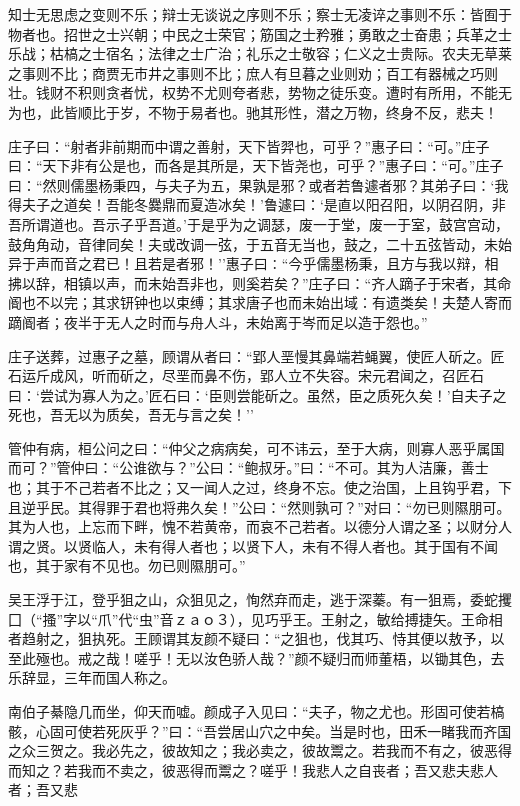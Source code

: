 \documentclass[]{article}
\begin{document}
知士无思虑之变则不乐；辩士无谈说之序则不乐；察士无凌谇之事则不乐：皆囿于物者也。招世之士兴朝；中民之士荣官；筋国之士矜雅；勇敢之士奋患；兵革之士乐战；枯槁之士宿名；法律之士广治；礼乐之士敬容；仁义之士贵际。农夫无草莱之事则不比；商贾无市井之事则不比；庶人有旦暮之业则劝；百工有器械之巧则壮。钱财不积则贪者忧，权势不尤则夸者悲，势物之徒乐变。遭时有所用，不能无为也，此皆顺比于岁，不物于易者也。驰其形性，潜之万物，终身不反，悲夫！

庄子曰：``射者非前期而中谓之善射，天下皆羿也，可乎？''惠子曰：``可。''庄子曰：``天下非有公是也，而各是其所是，天下皆尧也，可乎？''惠子曰：``可。''庄子曰：``然则儒墨杨秉四，与夫子为五，果孰是邪？或者若鲁遽者邪？其弟子曰：`我得夫子之道矣！吾能冬爨鼎而夏造冰矣！'鲁遽曰：`是直以阳召阳，以阴召阴，非吾所谓道也。吾示子乎吾道。'于是乎为之调瑟，废一于堂，废一于室，鼓宫宫动，鼓角角动，音律同矣！夫或改调一弦，于五音无当也，鼓之，二十五弦皆动，未始异于声而音之君已！且若是者邪！''惠子曰∶``今乎儒墨杨秉，且方与我以辩，相拂以辞，相镇以声，而未始吾非也，则奚若矣？''庄子曰：``齐人蹢子于宋者，其命阍也不以完；其求钘钟也以束缚；其求唐子也而未始出域：有遗类矣！夫楚人寄而蹢阍者；夜半于无人之时而与舟人斗，未始离于岑而足以造于怨也。''

庄子送葬，过惠子之墓，顾谓从者曰：``郢人垩慢其鼻端若蝇翼，使匠人斫之。匠石运斤成风，听而斫之，尽垩而鼻不伤，郢人立不失容。宋元君闻之，召匠石曰：`尝试为寡人为之。'匠石曰：`臣则尝能斫之。虽然，臣之质死久矣！'自夫子之死也，吾无以为质矣，吾无与言之矣！''

管仲有病，桓公问之曰：``仲父之病病矣，可不讳云，至于大病，则寡人恶乎属国而可？''管仲曰：``公谁欲与？''公曰：``鲍叔牙。''曰：``不可。其为人洁廉，善士也；其于不己若者不比之；又一闻人之过，终身不忘。使之治国，上且钩乎君，下且逆乎民。其得罪于君也将弗久矣！''公曰：``然则孰可？''对曰：``勿已则隰朋可。其为人也，上忘而下畔，愧不若黄帝，而哀不己若者。以德分人谓之圣；以财分人谓之贤。以贤临人，未有得人者也；以贤下人，未有不得人者也。其于国有不闻也，其于家有不见也。勿已则隰朋可。''

吴王浮于江，登乎狙之山，众狙见之，恂然弃而走，逃于深蓁。有一狙焉，委蛇攫囗（``搔''字以``爪''代``虫''音ｚａｏ３），见巧乎王。王射之，敏给搏捷矢。王命相者趋射之，狙执死。王顾谓其友颜不疑曰：``之狙也，伐其巧、恃其便以敖予，以至此殛也。戒之哉！嗟乎！无以汝色骄人哉？''颜不疑归而师董梧，以锄其色，去乐辞显，三年而国人称之。

南伯子綦隐几而坐，仰天而嘘。颜成子入见曰：``夫子，物之尤也。形固可使若槁骸，心固可使若死灰乎？''曰：``吾尝居山穴之中矣。当是时也，田禾一睹我而齐国之众三贺之。我必先之，彼故知之；我必卖之，彼故鬻之。若我而不有之，彼恶得而知之？若我而不卖之，彼恶得而鬻之？嗟乎！我悲人之自丧者；吾又悲夫悲人者；吾又悲
\end{document}
